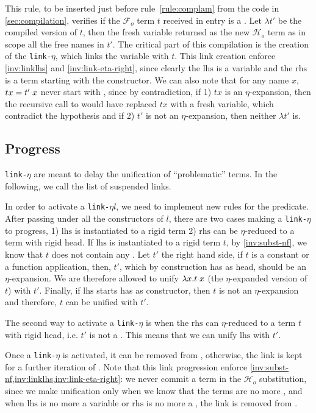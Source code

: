 \documentclass[sigconf,natbib=false,review]{acmart}
\newcommand{\appsep}{\ensuremath{\textcolor{lightgray}{\cdot}}}
\newcommand{\linketa}{\texttt{link-}\ensuremath{\eta}\xspace}
\newcommand{\Fo}{\ensuremath{\mathcal{F}_{\!o}\xspace}} %
\newcommand{\Ho}{\ensuremath{\mathcal{H}_o}\xspace}
\newcommand{\lhs}{\ensuremath{\mathrm{lhs}}\xspace}
\newcommand{\rhs}{\ensuremath{\mathrm{rhs}}\xspace}
\begin{document}


This rule, to be inserted just before rule~\ref{rule:complam} from the code in
\cref{sec:compilation}, verifies if the \Fo{} term $t$ received in entry is a
\maybeeta. Let $\lambda t'$ be the compiled version of $t$, then the fresh
variable  returned as the new \Ho term as in scope all the free names
in $t'$. The critical part of this compilation is the creation of the \linketa,
which links the variable  with $t$. This link creation enforce
\cref{inv:linklhs} and \cref{inv:link-eta-right}, since clearly the \lhs is a
variable and the \rhs is a term starting with the  constructor. We
can also note that for any name $x$, $tx = t' \appsep x$ never start with
, since by contradiction, if 1) $tx$ is an $\eta$-expansion, then
the recursive call to  would have replaced $tx$ with a fresh
variable, which contradict the hypothesis and if 2) $t'$ is not an
$\eta$-expansion, then neither $\lambda t'$ is.

\subsection{Progress}

\linketa are meant to delay the unification of ``problematic'' terms. In the
following, we call \linkStore the list of suspended links.

In order to activate a \linketa $l$, we need to implement new rules for the
 predicate. After passing under all the 
constructors of $l$, there are two cases making a \linketa to progress, 1) \lhs
is instantiated to a rigid term 2) \rhs can be $\eta$-reduced to a term with
rigid head. If \lhs is instantiated to a rigid term $t$, by \cref{inv:subst-nf},
we know that $t$ does not contain any \maybeeta. Let $t'$ the right hand side,
if $t$ is a constant or a function application, then, $t'$, which by
construction has  as head, should be an $\eta$-expansion. We are
therefore allowed to unify $\lambda x. t \appsep x$ (the $\eta$-expanded version
of $t$) with $t'$. Finally, if \lhs starts has  as constructor, then
$t$ is not an $\eta$-expansion and therefore, $t$ can be unified with $t'$. 

The second way to activate a \linketa is when the \rhs can $\eta$-reduced to a
term $t$ with rigid head, i.e. $t'$ is not a \maybeeta. This means that we can
unify \lhs with $t'$.

Once a \linketa is activated, it can be removed from \linkStore,
otherwise, the link is kept for a further iteration of . Note
that this link progression enforce
\cref{inv:subst-nf,inv:linklhs,inv:link-eta-right}: we never commit a term in
the \Ho substitution, since we make unification only when we know that the 
terms are no more \maybeeta, and when \lhs is no more a variable or \rhs is 
no more a \maybeeta, the link is removed from \linkStore.
\end{document}
